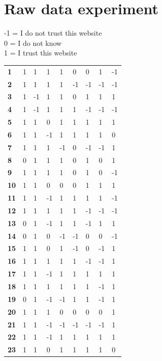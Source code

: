 \documentclass[twoside,openright,notitlepage]{uva-bachelor-thesis}
\begin{document}
\chapter{Raw data experiment}
-1  =  I do not trust this website\\
 0  =  I do not know\\
 1  =  I trust this website
 \begin{table}[h!]
\parbox{.45\linewidth}{
\centering
\begin{tabular}{lllllllll}
\textbf{1}  & 1 & 1  & 1  & 1  & 0  & 0  & 1  & -1 \\
\textbf{2 } & 1 & 1  & 1  & 1  & -1 & -1 & -1 & -1 \\
\textbf{3 } & 1 & -1 & 1  & 1  & 0  & 1  & 1  & 1  \\
\textbf{4 } & 1 & -1 & 1  & 1  & 1  & -1 & -1 & -1 \\
\textbf{5 } & 1 & 1  & 0  & 1  & 1  & 1  & 1  & 1  \\
\textbf{6 } & 1 & 1  & -1 & 1  & 1  & 1  & 1  & 0  \\
\textbf{7 } & 1 & 1  & 1  & -1 & 0  & -1 & -1 & 1  \\
\textbf{8 } & 0 & 1  & 1  & 1  & 0  & 1  & 0  & 1  \\
\textbf{9 } & 1 & 1  & 1  & 1  & 0  & 1  & 0  & -1 \\
\textbf{10} & 1 & 1  & 0  & 0  & 0  & 1  & 1  & 1  \\
\textbf{11} & 1 & 1  & -1 & 1  & 1  & 1  & 1  & -1 \\
\textbf{12} & 1 & 1  & 1  & 1  & 1  & -1 & -1 & -1 \\
\textbf{13} & 0 & 1  & -1 & 1  & 1  & -1 & 1  & 1  \\
\textbf{14} & 0 & 1  & 0  & -1 & -1 & 0  & 0  & -1 \\
\textbf{15} & 1 & 1  & 0  & 1  & -1 & 0  & -1 & 1  \\
\textbf{16} & 1 & 1  & 1  & 1  & 1  & -1 & -1 & 1  \\
\textbf{17} & 1 & 1  & -1 & 1  & 1  & 1  & 1  & 1  \\
\textbf{18} & 1 & 1  & 1  & 1  & 1  & 1  & -1 & 1  \\
\textbf{19} & 0 & 1  & -1 & -1 & 1  & 1  & -1 & 1  \\
\textbf{20} & 1 & 1  & 1  & 0  & 0  & 0  & 0  & 1  \\
\textbf{21} & 1 & 1  & -1 & -1 & -1 & -1 & -1 & 1  \\
\textbf{22} & 1 & 1  & -1 & 1  & 1  & 1  & 1  & 1  \\
\textbf{23} & 1 & 1  & 0  & 1  & 1  & 1  & 1  & 0  \\

\end{tabular}}
\end{table}
\end{document}
